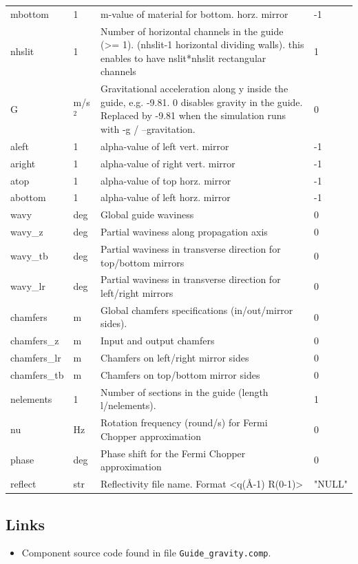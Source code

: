 \begin{longtable}{p{}p{}p{}p{}}
mbottom & 1 & m-value of material for bottom. horz. mirror & -1 \\
nhslit & 1 & Number of horizontal channels in the guide (\textgreater{}= 1). (nhslit-1 horizontal dividing walls). this enables to have nslit*nhslit rectangular channels & 1 \\
G & m/s$^{2}$ & Gravitational acceleration along y inside the guide, e.g. -9.81. 0 disables gravity in the guide. Replaced by -9.81 when the simulation runs with -g / --gravitation. & 0 \\
aleft & 1 & alpha-value of left  vert. mirror & -1 \\
aright & 1 & alpha-value of right vert. mirror & -1 \\
atop & 1 & alpha-value of top   horz. mirror & -1 \\
abottom & 1 & alpha-value of left  horz. mirror & -1 \\
wavy & deg & Global guide waviness & 0 \\
wavy\_z & deg & Partial waviness along propagation axis & 0 \\
wavy\_tb & deg & Partial waviness in transverse direction for top/bottom mirrors & 0 \\
wavy\_lr & deg & Partial waviness in transverse direction for left/right mirrors & 0 \\
chamfers & m & Global chamfers specifications (in/out/mirror sides). & 0 \\
chamfers\_z & m & Input and output chamfers & 0 \\
chamfers\_lr & m & Chamfers on left/right mirror sides & 0 \\
chamfers\_tb & m & Chamfers on top/bottom mirror sides & 0 \\
nelements & 1 & Number of sections in the guide (length l/nelements). & 1 \\
nu & Hz & Rotation frequency (round/s) for Fermi Chopper approximation & 0 \\
phase & deg & Phase shift for the Fermi Chopper approximation & 0 \\
reflect & str & Reflectivity file name. Format \textless{}q(\AA{}-1) R(0-1)\textgreater{} & "NULL" \\
\bottomrule
\end{longtable}

\subsection*{Links}
\begin{itemize}
  \item Component source code found in file \texttt{Guide\_gravity.comp}.
\end{itemize}
